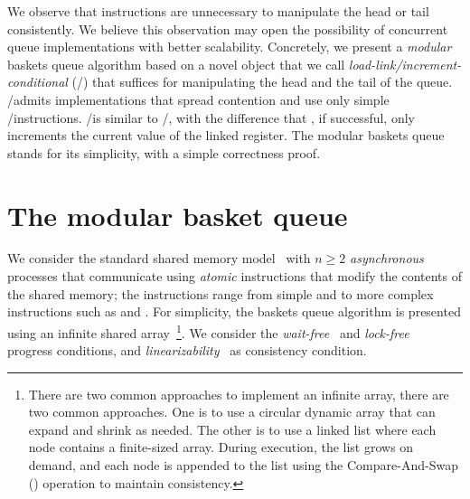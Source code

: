 We observe that \RMW instructions are unnecessary to manipulate the head or tail consistently. We believe this observation may open the possibility of concurrent queue implementations with better scalability. Concretely, we present a \emph{modular} baskets queue algorithm based on a novel object that we call \emph{load-link/increment-conditional} (\LL/\IC) that suffices for manipulating the head and the tail of the queue.  \LL/\IC admits implementations that spread contention and use only simple \R/\W instructions.  \LL/\IC is similar to \LL/\SC, with the difference that \IC, if successful, only increments the current value of the linked register. The modular baskets queue stands for its simplicity, with a simple correctness proof.

\section{The modular basket queue}
\label{sec-basket-queue}

We consider the standard shared memory model~\cite{DBLP_journals_toplas_HerlihyW90} with $n \geq 2$ \emph{asynchronous} processes that communicate using \emph{atomic} instructions that modify the contents of the shared memory; the instructions range from simple \R and \W to more complex \RMW instructions such as \FAI and \CAS. For simplicity, the baskets queue algorithm is presented using an infinite shared array~\footnote{There are two common approaches to implement an infinite array, there are two common approaches. One is to use a circular dynamic array that can expand and shrink as needed. The other is to use a linked list where each node contains a finite-sized array. During execution, the list grows on demand, and each node is appended to the list using the Compare-And-Swap (\CAS) operation to maintain consistency.}. We consider the \emph{wait-free}~\cite{DBLP_journals_toplas_Herlihy91} and \emph{lock-free}~\cite{DBLP_conf_opodis_HerlihyS11} progress conditions, and \emph{linearizability}~\cite{DBLP_journals_toplas_HerlihyW90} as consistency condition.

